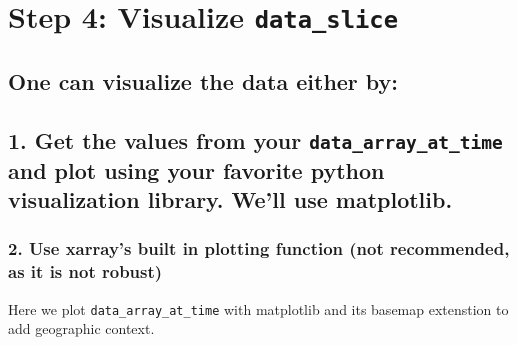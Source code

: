\documentclass[
  letterpaper,
  DIV=11,
  numbers=noendperiod]{scrreprt}
\begin{document}
\section{\texorpdfstring{\textbf{Step 4: Visualize
\texttt{data\_slice}}}{Step 4: Visualize data\_slice}}\label{step-4-visualize-data_slice}

\subsection{One can visualize the data either
by:}\label{one-can-visualize-the-data-either-by}

\subsection{\texorpdfstring{1. Get the values from your
\texttt{data\_array\_at\_time} and plot using your favorite python
visualization library. We'll use
matplotlib.}{1. Get the values from your data\_array\_at\_time and plot using your favorite python visualization library. We'll use matplotlib.}}\label{get-the-values-from-your-data_array_at_time-and-plot-using-your-favorite-python-visualization-library.-well-use-matplotlib.}

\subsubsection{2. Use xarray's built in plotting function (not
recommended, as it is not
robust)}\label{use-xarrays-built-in-plotting-function-not-recommended-as-it-is-not-robust}

Here we plot \texttt{data\_array\_at\_time} with matplotlib and its
basemap extenstion to add geographic context.
\end{document}
